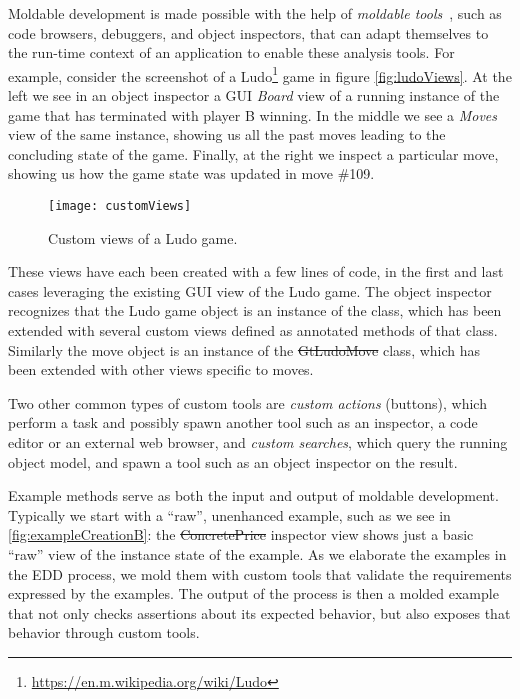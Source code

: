 \documentclass[acmsmall,screen,authorversion,nonacm]{acmart} %
\begin{document}
Moldable development is made possible with the help of \emph{moldable tools}~\cite{Chis17a}, such as code browsers, debuggers, and object inspectors, that can adapt themselves to the run-time context of an application to enable these analysis tools.
For example, consider the screenshot of a Ludo\footnote{\href{https://web.archive.org/web/20240530004250/https://en.m.wikipedia.org/wiki/Ludo}{https://en.m.wikipedia.org/wiki/Ludo}} game in figure \autoref{fig:ludoViews}.
At the left we see in an object inspector a GUI \emph{Board} view of a running instance of the game that has terminated with player B winning.
In the middle we see a \emph{Moves} view of the same instance, showing us all the past moves leading to the concluding state of the game.
Finally, at the right we inspect a particular move, showing us how the game state was updated in move \#109.

\begin{figure}[h]
  \texttt{[image: customViews]}
  \caption{Custom views of a Ludo game.}
  \label{fig:ludoViews}
\end{figure}

These views have each been created with a few lines of code, in the first and last cases leveraging the existing GUI view of the Ludo game.
The object inspector recognizes that the Ludo game object is an instance of the  class, 
which has been extended with several custom views defined as annotated methods of that class.
Similarly the move object is an instance of the \st{GtLudoMove} class, which has been extended with other views specific to moves.

Two other common types of custom tools are \emph{custom actions} (\eg buttons), which perform a task and possibly spawn another tool such as an inspector, a code editor or an external web browser, and \emph{custom searches}, which query the running object model, and spawn a tool such as an object inspector on the result.

Example methods serve as both the input and output of moldable development.
Typically we start with a ``raw'', unenhanced example, such as we see in \autoref{fig:exampleCreationB}: the \st{ConcretePrice} inspector view shows just a basic ``raw'' view of the instance state of the example.
As we elaborate the examples in the EDD process, we mold them with custom tools that validate the requirements expressed by the examples.
The output of the process is then a molded example that not only checks assertions about its expected behavior, but also exposes that behavior through custom tools.
\end{document}
